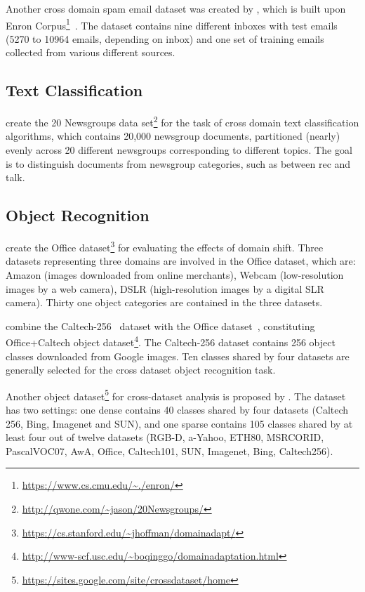 \documentclass[prodmode]{acmsmall}  %
\begin{document}
Another cross domain spam email dataset was created by , which is built upon Enron Corpus\footnote{\url{https://www.cs.cmu.edu/~./enron/}}~\cite{Klimt2004}. The dataset contains nine different inboxes with test emails (5270 to 10964 emails, depending on inbox) and one set of training emails collected from various different sources.
\subsection{Text Classification}
 create the 20 Newsgroups data set\footnote{\url{http://qwone.com/~jason/20Newsgroups/}} for the task of cross domain text classification algorithms, which contains 20,000 newsgroup documents, partitioned (nearly) evenly across 20 different newsgroups corresponding to different topics. The goal is to distinguish documents from newsgroup categories, such as between rec and talk.
 
\subsection{Object Recognition}
 create the Office dataset\footnote{\url{https://cs.stanford.edu/~jhoffman/domainadapt/}} for evaluating the effects of domain shift. Three datasets representing three domains are involved in the Office dataset, which are: Amazon (images downloaded from online merchants), Webcam (low-resolution images by a web camera), DSLR (high-resolution images by a digital SLR camera). Thirty one object categories are contained in the three datasets.
 
 combine the Caltech-256~\cite{Griffin2007} dataset with the Office dataset~\cite{Saenko2010}, constituting Office+Caltech object dataset\footnote{\url{http://www-scf.usc.edu/~boqinggo/domainadaptation.html}}. The Caltech-256 dataset contains 256 object classes downloaded from Google images. Ten classes shared by four datasets are generally selected for the cross dataset object recognition task.

Another object dataset\footnote{\url{https://sites.google.com/site/crossdataset/home}} for cross-dataset analysis is proposed by . The dataset has two settings: one dense contains 40 classes shared by four datasets (Caltech 256, Bing, Imagenet and SUN), and one sparse contains 105 classes shared by at least four out of twelve datasets (RGB-D, a-Yahoo, ETH80, MSRCORID, PascalVOC07, AwA, Office, Caltech101, SUN, Imagenet, Bing, Caltech256). 
\end{document}
